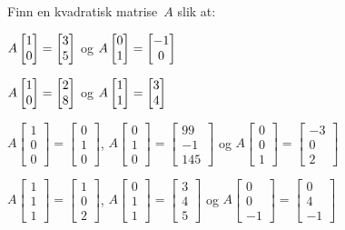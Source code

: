 \begin{oppgave}
Finn en kvadratisk matrise~$A$ slik at:
\begin{punkt}
$A \begin{bmatrix} 1 \\ 0 \end{bmatrix} = \begin{bmatrix} 3 \\ 5 \end{bmatrix}$
og
$A \begin{bmatrix} 0 \\ 1 \end{bmatrix} = \begin{bmatrix} -1 \\ 0 \end{bmatrix}$
\end{punkt}
\begin{punkt}
$A \begin{bmatrix} 1 \\ 0 \end{bmatrix} = \begin{bmatrix} 2 \\ 8 \end{bmatrix}$
og
$A \begin{bmatrix} 1 \\ 1 \end{bmatrix} = \begin{bmatrix} 3 \\ 4 \end{bmatrix}$
\end{punkt}

\begin{punkt}
$A \begin{bmatrix}
1\\
0\\
0
\end{bmatrix}
 =  \begin{bmatrix}
0\\
1\\
0
\end{bmatrix} 
 $, $A \begin{bmatrix}
0\\
1\\
0
\end{bmatrix}
 =  \begin{bmatrix}
99\\
-1\\
145
\end{bmatrix} 
$%
og $A \begin{bmatrix}
0\\
0\\
1
\end{bmatrix}
 =  \begin{bmatrix}
-3\\
0\\
2
\end{bmatrix}
 $
\end{punkt}

\begin{punkt}
$A \begin{bmatrix}
1\\
1\\
1
\end{bmatrix}
 =  \begin{bmatrix}
1\\
0\\
2
\end{bmatrix} 
 $, $A \begin{bmatrix}
0\\
1\\
1
\end{bmatrix}
 =  \begin{bmatrix}
3\\
4\\
5
\end{bmatrix} 
$%
og $A \begin{bmatrix}
0\\
0\\
-1
\end{bmatrix}
 =  \begin{bmatrix}
0\\
4\\
-1
\end{bmatrix}
 $
\end{punkt}
\end{oppgave}
